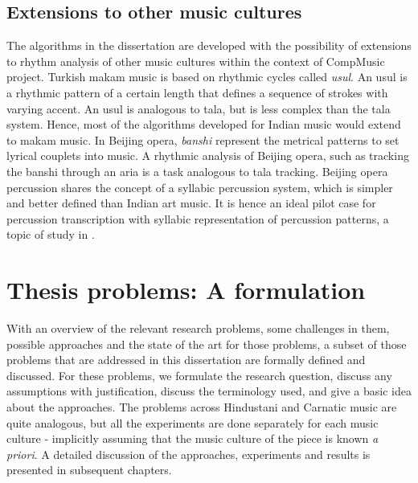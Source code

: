 \subsection{Extensions to other music cultures}
The algorithms in the dissertation are developed with the possibility of extensions to rhythm analysis of other music cultures within the context of CompMusic project. Turkish makam music is based on rhythmic cycles called \emph{usul}. An usul is a rhythmic pattern of a certain length that defines a sequence of strokes with varying accent. An usul is analogous to \gls{tala}, but is less complex than the \gls{tala} system. Hence, most of the algorithms developed for Indian music would extend to makam music. In Beijing opera, \textit{banshi} represent the metrical patterns to set lyrical couplets into music. A rhythmic analysis of Beijing opera, such as tracking the banshi through an aria is a task analogous to \gls{tala} tracking. Beijing opera percussion shares the concept of a syllabic percussion system, which is simpler and better defined than Indian art music. It is hence an ideal pilot case for percussion transcription with syllabic representation of percussion patterns, a topic of study in . %
%
\section{Thesis problems: A formulation}\label{sec:probdef:thesis}
With an overview of the relevant research problems, some challenges in them, possible approaches and the state of the art for those problems, a subset of those problems that are addressed in this dissertation are formally defined and discussed. For these problems, we formulate the research question, discuss any assumptions with justification, discuss the terminology used, and give a basic idea about the approaches. The problems across Hindustani and Carnatic music are quite analogous, but all the experiments are done separately for each music culture - implicitly assuming that the music culture of the piece is known \textit{a priori}. A detailed discussion of the approaches, experiments and results is presented in subsequent chapters. 
% 
